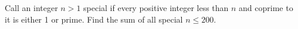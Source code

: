 Call an integer $n>1$ special if every positive integer less than $n$ and coprime to it is either 1 or prime. Find the sum of all special $n\le200$.
